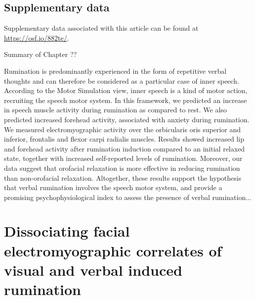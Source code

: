 \documentclass[a4paper,12pt,twoside,openright,oldfontcommands,final]{memoir}
\newcommand\getcurrentref[1]{
 \ifnumequal{\value{#1}}{0}
  {??}
  {\the\value{#1}}
}
\begin{document}
\hypertarget{suppCH3}{%
\section{Supplementary data}\label{suppCH3}}

Supplementary data associated with this article can be found at \url{https://osf.io/882te/}.

\newpage

\begin{vplace}[1]

\begin{summary}{Summary of Chapter\getcurrentref{chapter}}

Rumination is predominantly experienced in the form of repetitive verbal thoughts and can therefore be considered as a particular case of inner speech. According to the Motor Simulation view, inner speech is a kind of motor action, recruiting the speech motor system. In this framework, we predicted an increase in speech muscle activity during rumination as compared to rest. We also predicted increased forehead activity, associated with anxiety during rumination. We measured electromyographic activity over the orbicularis oris superior and inferior, frontalis and flexor carpi radialis muscles. Results showed increased lip and forehead activity after rumination induction compared to an initial relaxed state, together with increased self-reported levels of rumination. Moreover, our data suggest that orofacial relaxation is more effective in reducing rumination than non-orofacial relaxation. Altogether, these results support the hypothesis that verbal rumination involves the speech motor system, and provide a promising psychophysiological index to assess the presence of verbal rumination...

\end{summary}

\end{vplace}

\hypertarget{chap4}{%
\chapter{Dissociating facial electromyographic correlates of visual and verbal induced rumination}\label{chap4}}
\end{document}
